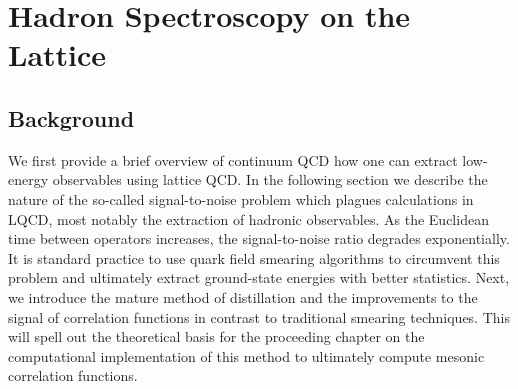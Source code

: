 
\chapter{Hadron Spectroscopy on the Lattice}
\label{sec:spec}
\section{Background}
We first provide a brief overview of continuum QCD how one can extract low-energy observables using lattice QCD. In the following section we describe the nature of the so-called signal-to-noise problem which plagues calculations in LQCD, most notably the extraction of hadronic observables. As the Euclidean time between operators increases, the signal-to-noise ratio degrades exponentially. It is standard practice to use quark field smearing algorithms to circumvent this problem and ultimately extract ground-state energies with better statistics. Next, we introduce the mature method of distillation \cite{peardon_novel_2009} and the improvements to the signal of correlation functions in contrast to traditional smearing techniques. This will spell out the theoretical basis for the proceeding chapter on the computational implementation of this method to ultimately compute mesonic correlation functions. 


